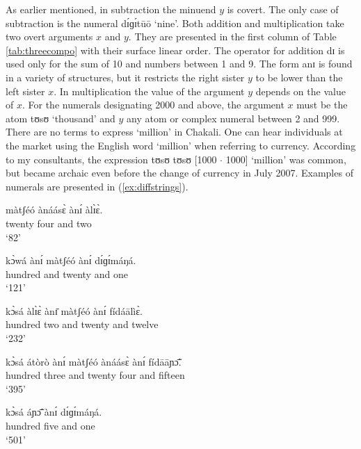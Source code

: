 \begin{exe}
\begin{exe}
\begin{exe}
{\begin{exe}
\begin{exe}
\begin{exe}
\begin{exe}
\begin{exe}
\begin{exe}
\begin{exe}
\begin{exe}
\begin{exe}
As earlier mentioned, in subtraction  the minuend $y$ is covert. The only case
of subtraction 
is the numeral {\sls   dɪ́ɡɪ́tūō} `nine'.  Both
addition  and multiplication take two overt arguments  $x$ and
$y$. They
are presented in the first column  of Table \ref{tab:threecompo} with their
surface linear order. The operator for addition {\sls dɪ} is used only  for the
sum of 10 and numbers between 1 and 9. The form {\sls anɪ} is found in a variety
of structures, but it restricts the right sister $y$ to be lower than the left
sister $x$. In multiplication  the value of the argument $y$ 
depends on the
value of $x$. For the numerals designating  2000 and above, the argument $x$
must be
the atom {\sls tʊsʊ} `thousand' and $y$  any atom or complex numeral between 2 
and
999. There are no terms to express  `million' in Chakali. One can hear 
individuals at the
market  using the English word `million' when referring to  currency. According
to my consultants,  the expression {\sls  tʊsʊ tʊsʊ} [1000 $\cdot$ 1000]
`million' was
common, but became archaic even before the change of currency  in July 
2007. Examples of numerals are presented in (\ref{ex:diffstrings}).


   



\ea\label{ex:diffstrings}
  \ea\label{ex:82}
\gll  màtʃéó  ànáásɛ̀ ànɪ́  àlɪ̀ɛ̀.\\
   {twenty} {four} {and} {two}\\
\glt `82'

\ex\label{ex:121}
\gll  kɔ̀wá  ànɪ́  màtʃéó  ànɪ́   dɪ́ɡɪ́máŋá.\\
    {hundred}  {and}  {twenty}  {and} {one}\\
\glt `121'

\ex\label{ex:232}
\gll  kɔ̀sá  àlɪ̀ɛ̀ ànɪ̄  màtʃéó  ànɪ́  fídáālìɛ̀.\\
    {hundred}  {two}  {and}   {twenty}  {and}  {twelve}\\
\glt `232'

\ex\label{ex:395}
\gll kɔ̀sá átòrò ànɪ́ màtʃéó ànáásɛ̀ ànɪ́  fídāāɲɔ̃̄.\\
 {hundred} {three}  {and} {twenty}  {four} {and}  {fifteen}\\
\glt `395'

\ex\label{ex:501}
\gll kɔ̀sá  áɲɔ̃̄ ànɪ́  dɪ́ɡɪ́máŋá.\\
    {hundred} {five}  {and}  {one}\\
\glt `501'


\end{exe}
\end{exe}
\end{exe}
\end{exe}
\end{exe}
\end{exe}
\end{exe}
\end{exe}
\end{exe}}
\end{exe}
\end{exe}
\end{exe}
